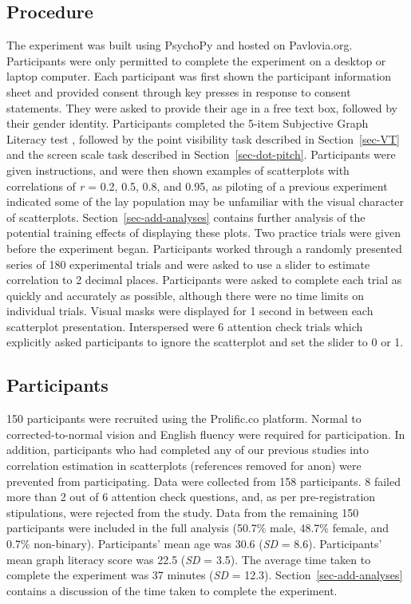 \documentclass[manuscript, review, anonymous, screen]{acmart}
\begin{document}
\hypertarget{sec-gen-procedure}{%
\subsection{Procedure}\label{sec-gen-procedure}}

The experiment was built using PsychoPy \citep{pierce_2019} and hosted
on Pavlovia.org. Participants were only permitted to complete the
experiment on a desktop or laptop computer. Each participant was first
shown the participant information sheet and provided consent through key
presses in response to consent statements. They were asked to provide
their age in a free text box, followed by their gender identity.
Participants completed the 5-item Subjective Graph Literacy test
\citep{garcia_2016}, followed by the point visibility task described in
Section~\ref{sec-VT} and the screen scale task described in
Section~\ref{sec-dot-pitch}. Participants were given instructions, and
were then shown examples of scatterplots with correlations of \emph{r} =
0.2, 0.5, 0.8, and 0.95, as piloting of a previous experiment indicated
some of the lay population may be unfamiliar with the visual character
of scatterplots. Section~\ref{sec-add-analyses} contains further
analysis of the potential training effects of displaying these plots.
Two practice trials were given before the experiment began. Participants
worked through a randomly presented series of 180 experimental trials
and were asked to use a slider to estimate correlation to 2 decimal
places. Participants were asked to complete each trial as quickly and
accurately as possible, although there were no time limits on individual
trials. Visual masks were displayed for 1 second in between each
scatterplot presentation. Interspersed were 6 attention check trials
which explicitly asked participants to ignore the scatterplot and set
the slider to 0 or 1.

\hypertarget{sec-participants}{%
\subsection{Participants}\label{sec-participants}}

150 participants were recruited using the Prolific.co platform. Normal
to corrected-to-normal vision and English fluency were required for
participation. In addition, participants who had completed any of our
previous studies into correlation estimation in scatterplots (references
removed for anon) were prevented from participating. Data were collected
from 158 participants. 8 failed more than 2 out of 6 attention check
questions, and, as per pre-registration stipulations, were rejected from
the study. Data from the remaining 150 participants were included in the
full analysis (50.7\% male, 48.7\% female, and 0.7\% non-binary).
Participants' mean age was 30.6 (\emph{SD} = 8.6). Participants' mean
graph literacy score was 22.5 (\emph{SD} = 3.5). The average time taken
to complete the experiment was 37 minutes (\emph{SD} = 12.3).
Section~\ref{sec-add-analyses} contains a discussion of the time taken
to complete the experiment.
\end{document}

